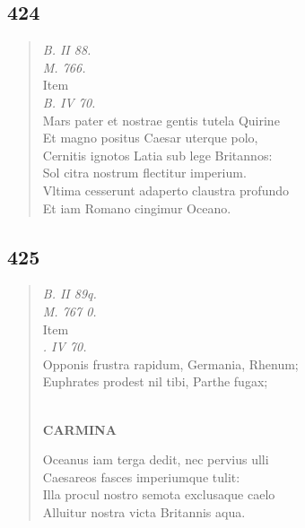 \documentclass[11pt, a4paper]{report}
\begin{document}
            \subsection*{424}
      \begin{verse}
      \textit{B. II 88.} \\ \textit{M. 766.} \\  \lbrack Item \rbrack  \\ \textit{B. IV 70.} \\ Mars pater et nostrae gentis tutela Quirine \\ Et magno positus Caesar uterque polo, \\ Cernitis ignotos Latia sub lege Britannos: \\ Sol citra nostrum flectitur imperium. \\ Vltima cesserunt adaperto claustra profundo \\ Et iam Romano cingimur Oceano. \\ 
      \end{verse}
  
            \subsection*{425}
      \begin{verse}
      \textit{B. II 89q.} \\ \textit{M. 767 0.} \\  \lbrack Item \rbrack  \\ \textit{. IV 70.} \\ Opponis frustra rapidum, Germania, Rhenum; \\ Euphrates prodest nil tibi, Parthe fugax; \\ 
        ﻿\pagebreak 
    \begin{center} \textbf{CARMINA} \end{center} \marginpar{[326]} Oceanus iam terga dedit, nec pervius ulli \\ Caesareos fasces imperiumque tulit: \\ Illa procul nostro semota exclusaque caelo \\ Alluitur nostra victa Britannis aqua. \\ 
      \end{verse}
  
\end{document}
